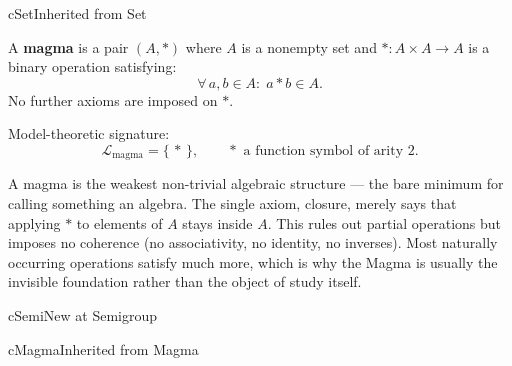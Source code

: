 \begin{bpinh}{cSet}{Inherited from Set}
\end{bpinh}

\begin{definition}[Magma]
\label{def:formal-model-theoretic-structures-l325}
  A \textbf{magma} is a pair $(A, *)$ where $A$ is a nonempty set and
  $* : A \times A \to A$ is a binary operation satisfying:
  \[
    \forall\,a, b \in A:\; a * b \in A. \tag{Closure}
  \]
  No further axioms are imposed on $*$.

  \medskip\noindent
  Model-theoretic signature:
  \[
    \mathcal{L}_{\mathrm{magma}} = \{\,*\,\},
    \qquad * \text{ a function symbol of arity } 2.
  \]
\end{definition}

\begin{remark}
  A magma is the weakest non-trivial algebraic structure --- the bare minimum
  for calling something an algebra.  The single axiom, closure, merely says
  that applying $*$ to elements of $A$ stays inside $A$.  This rules out
  partial operations but imposes no coherence (no associativity, no identity,
  no inverses).  Most naturally occurring operations satisfy much more, which
  is why the Magma is usually the invisible foundation rather than the object
  of study itself.
\end{remark}



\clearpage\thispagestyle{plain}

\begin{bpnew}{cSemi}{New at Semigroup}
\end{bpnew}

\begin{bpinh}{cMagma}{Inherited from Magma}
\end{bpinh}

